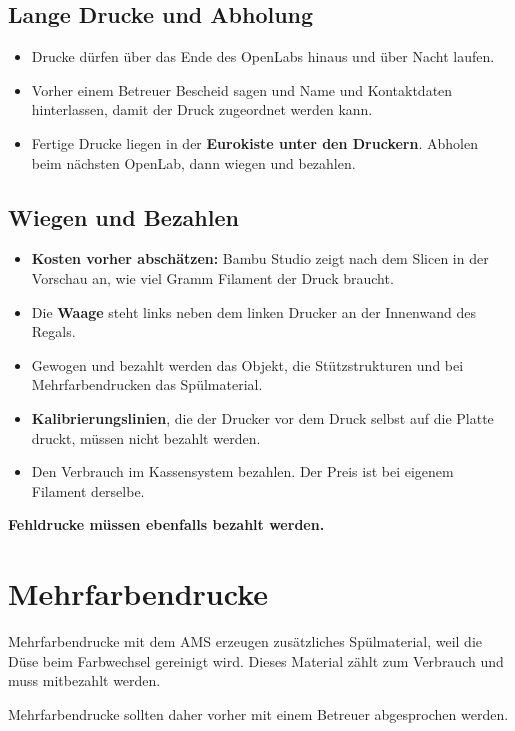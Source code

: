 \documentclass{\basedir/fablab-document}
\begin{document}
	\subsection{Lange Drucke und Abholung}
	
	\begin{itemize}
		\item Drucke dürfen über das Ende des OpenLabs hinaus und über Nacht laufen.
		\item Vorher einem Betreuer Bescheid sagen und Name und Kontaktdaten hinterlassen, damit der Druck zugeordnet werden kann.
		\item Fertige Drucke liegen in der \textbf{Eurokiste unter den Druckern}. Abholen beim nächsten OpenLab, dann wiegen und bezahlen.
	\end{itemize}
	
	\subsection{Wiegen und Bezahlen}
	
	\begin{itemize}
		\item \textbf{Kosten vorher abschätzen:} Bambu Studio zeigt nach dem Slicen in der Vorschau an, wie viel Gramm Filament der Druck braucht.
		\item Die \textbf{Waage} steht links neben dem linken Drucker an der Innenwand des Regals.
		\item Gewogen und bezahlt werden das Objekt, die Stützstrukturen und bei Mehrfarbendrucken das Spülmaterial.
		\item \textbf{Kalibrierungslinien}, die der Drucker vor dem Druck selbst auf die Platte druckt, müssen nicht bezahlt werden.
		\item Den Verbrauch im Kassensystem bezahlen. Der Preis ist bei eigenem Filament derselbe.
	\end{itemize}
	
	\textbf{Fehldrucke müssen ebenfalls bezahlt werden.}
	
	\section{Mehrfarbendrucke}
	
	Mehrfarbendrucke mit dem AMS erzeugen zusätzliches Spülmaterial, weil die Düse beim Farbwechsel gereinigt wird. Dieses Material zählt zum Verbrauch und muss mitbezahlt werden.
	
	Mehrfarbendrucke sollten daher vorher mit einem Betreuer abgesprochen werden.
	
\end{document}
